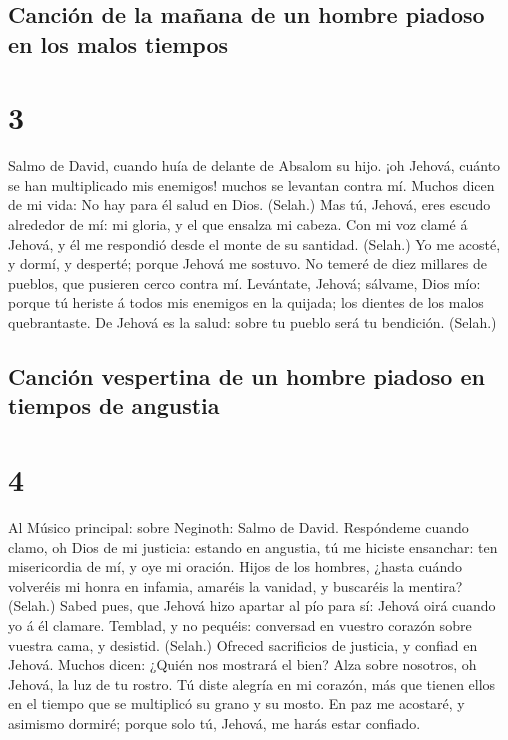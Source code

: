 \hypertarget{canciuxf3n-de-la-mauxf1ana-de-un-hombre-piadoso-en-los-malos-tiempos}{%
\subsection{Canción de la mañana de un hombre piadoso en los malos
tiempos}\label{canciuxf3n-de-la-mauxf1ana-de-un-hombre-piadoso-en-los-malos-tiempos}}

\hypertarget{section-2}{%
\section{3}\label{section-2}}

 Salmo de David, cuando huía de delante de Absalom su
hijo. ¡oh Jehová, cuánto se han multiplicado mis enemigos! muchos se
levantan contra mí.  Muchos dicen de mi vida: No hay para
él salud en Dios. (Selah.)  Mas tú, Jehová, eres escudo
alrededor de mí: mi gloria, y el que ensalza mi cabeza. 
Con mi voz clamé á Jehová, y él me respondió desde el monte de su
santidad. (Selah.)  Yo me acosté, y dormí, y desperté;
porque Jehová me sostuvo.  No temeré de diez millares de
pueblos, que pusieren cerco contra mí.  Levántate, Jehová;
sálvame, Dios mío: porque tú heriste á todos mis enemigos en la quijada;
los dientes de los malos quebrantaste.  De Jehová es la
salud: sobre tu pueblo será tu bendición. (Selah.)

\hypertarget{canciuxf3n-vespertina-de-un-hombre-piadoso-en-tiempos-de-angustia}{%
\subsection{Canción vespertina de un hombre piadoso en tiempos de
angustia}\label{canciuxf3n-vespertina-de-un-hombre-piadoso-en-tiempos-de-angustia}}

\hypertarget{section-3}{%
\section{4}\label{section-3}}

 Al Músico principal: sobre Neginoth: Salmo de David.
Respóndeme cuando clamo, oh Dios de mi justicia: estando en angustia, tú
me hiciste ensanchar: ten misericordia de mí, y oye mi oración.
 Hijos de los hombres, ¿hasta cuándo volveréis mi honra en
infamia, amaréis la vanidad, y buscaréis la mentira? (Selah.)
 Sabed pues, que Jehová hizo apartar al pío para sí:
Jehová oirá cuando yo á él clamare.  Temblad, y no
pequéis: conversad en vuestro corazón sobre vuestra cama, y desistid.
(Selah.)  Ofreced sacrificios de justicia, y confiad en
Jehová.  Muchos dicen: ¿Quién nos mostrará el bien? Alza
sobre nosotros, oh Jehová, la luz de tu rostro.  Tú diste
alegría en mi corazón, más que tienen ellos en el tiempo que se
multiplicó su grano y su mosto.  En paz me acostaré, y
asimismo dormiré; porque solo tú, Jehová, me harás estar confiado.

